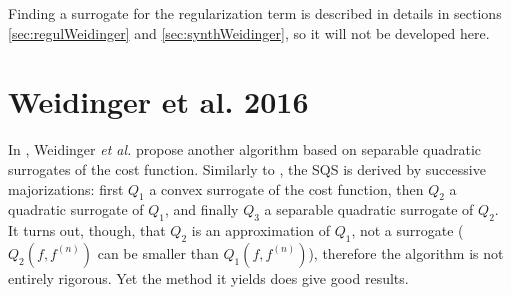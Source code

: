 \documentclass[a4paper, 10pt]{article}
\begin{document}
Finding a surrogate for the regularization term is described in details in sections \ref{sec:regulWeidinger} and \ref{sec:synthWeidinger}, so it will not be developed here.

\section{Weidinger et al. 2016}
In \cite{weidinger_polychromatic_2016}, Weidinger \textit{et al.} propose another algorithm based on separable quadratic surrogates of the cost function. Similarly to \cite{long_multi-material_2014}, 
the SQS is derived by successive majorizations: first $Q_1$ a convex surrogate of the cost function, then $Q_2$ a quadratic surrogate of $Q_1$, and finally $Q_3$ a separable quadratic surrogate of $Q_2$.
It turns out, though, that $Q_2$ is an approximation of $Q_1$, not a surrogate ($Q_2(f, f^{(n)})$ can be smaller than $Q_1(f, f^{(n)})$), therefore the algorithm is not entirely rigorous. Yet the method
it yields does give good results. 
\end{document}
